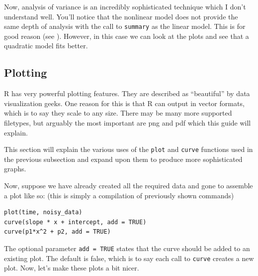 \documentclass[12pt]{article}
\begin{document}

Now, analysis of variance is an incredibly sophisticated technique which I don't understand well. You'll notice that the nonlinear model does not provide the same depth of analysis with the call to \verb|summary| as the linear model. This is for good reason (see \cite{nlsanova}). However, in this case we can look at the plots and see that a quadratic model fits better.

\subsection{Plotting}
R has very powerful plotting features. They are described as ``beautiful'' by data visualization geeks. One reason for this is that R can output in vector formats, which is to say they scale to any size. There may be many more supported filetypes, but arguably the most important are png and pdf which this guide will explain.

This section will explain the various uses of the \verb|plot| and \verb|curve| functions used in the previous subsection and expand upon them to produce more sophisticated graphs.

Now, suppose we have already created all the required data and gone to assemble a plot like so: (this is simply a compilation of previously shown commands)
\begin{Verbatim}[frame=single, fontsize=\small]
plot(time, noisy_data)
curve(slope * x + intercept, add = TRUE)
curve(p1*x^2 + p2, add = TRUE)
\end{Verbatim}

The optional parameter \verb|add = TRUE| states that the curve should be added to an existing plot. The default is false, which is to say each call to \verb|curve| creates a new plot. Now, let's make these plots a bit nicer.
\end{document}
